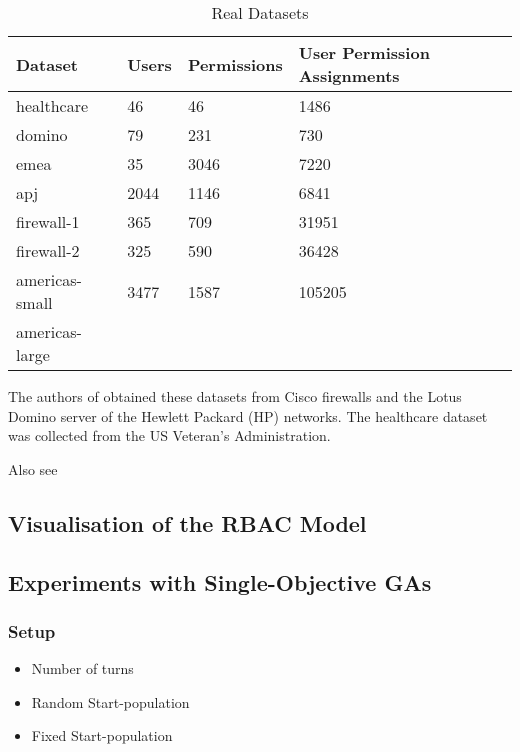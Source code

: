 \begin{table}[ht]
    \centering
    \begin{tabular}{|l|l|l|l|}
        \hline
        \rowcolor[HTML]{EFEFEF} 
        \textbf{Dataset} & \textbf{Users} & \textbf{Permissions} & \textbf{User Permission Assignments} \\ \hline
        healthcare       & 46             & 46                   & 1486                                 \\ \hline
        domino           & 79             & 231                  & 730                                  \\ \hline
        emea             & 35             & 3046                 & 7220                                 \\ \hline
        apj              & 2044           & 1146                 & 6841                                 \\ \hline
        firewall-1       & 365            & 709                  & 31951                                \\ \hline
        firewall-2       & 325            & 590                  & 36428                                \\ \hline
        americas-small   & 3477           & 1587                 & 105205                               \\ \hline
        americas-large   &                &                      &                                      \\ \hline
    \end{tabular}
    \caption{Real Datasets}
    \label{tab:realDatasets}
\end{table}

The authors of \cite{Ene} obtained these datasets from Cisco firewalls and the Lotus Domino server of the Hewlett Packard (HP) networks. The healthcare dataset was collected from the US Veteran’s Administration.

Also see \cite{Xu}

\subsection{Visualisation of the RBAC Model}

\subsection{Experiments with Single-Objective GAs}
\subsubsection{Setup}
\begin{itemize}
    \item Number of turns
    \item Random Start-population
    \item Fixed Start-population
\end{itemize}
